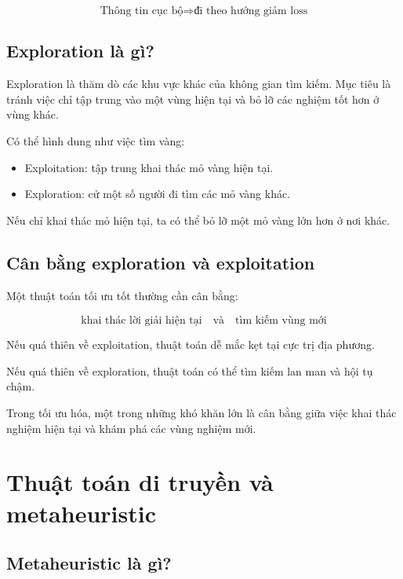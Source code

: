 \documentclass[12pt,a4paper]{report}
\begin{document}
\[
    \text{Thông tin cục bộ} \Rightarrow \text{đi theo hướng giảm loss}
\]

\section{Exploration là gì?}

Exploration là thăm dò các khu vực khác của không gian tìm kiếm. Mục tiêu là tránh việc chỉ tập trung vào một vùng hiện tại và bỏ lỡ các nghiệm tốt hơn ở vùng khác.

\begin{vidu}
Có thể hình dung như việc tìm vàng:

\begin{itemize}
    \item Exploitation: tập trung khai thác mỏ vàng hiện tại.
    \item Exploration: cử một số người đi tìm các mỏ vàng khác.
\end{itemize}

Nếu chỉ khai thác mỏ hiện tại, ta có thể bỏ lỡ một mỏ vàng lớn hơn ở nơi khác.
\end{vidu}

\section{Cân bằng exploration và exploitation}

Một thuật toán tối ưu tốt thường cần cân bằng:

\[
    \text{khai thác lời giải hiện tại}
    \quad \text{và} \quad
    \text{tìm kiếm vùng mới}
\]

Nếu quá thiên về exploitation, thuật toán dễ mắc kẹt tại cực trị địa phương.

Nếu quá thiên về exploration, thuật toán có thể tìm kiếm lan man và hội tụ chậm.

\begin{ghinho}
Trong tối ưu hóa, một trong những khó khăn lớn là cân bằng giữa việc khai thác nghiệm hiện tại và khám phá các vùng nghiệm mới.
\end{ghinho}

\chapter{Thuật toán di truyền và metaheuristic}

\section{Metaheuristic là gì?}
\end{document}
